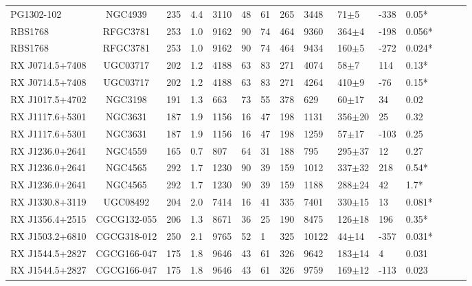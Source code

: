 \begin{landscape}
\begin{center}
\begin{longtable}{l c l l l l l l l l l l l l l}
PG1302-102  				&  NGC4939  					&  235  & 4.4 &  3110  	&  48  &  61  	&  265  &  3448  	&  71$\pm$5  		&  -338  	&  0.05*  \\
RBS1768  				&  RFGC3781  					&  253  & 1.0 &  9162  	&  90  &  74  	&  464  &  9360  	&  364$\pm$4  		&  -198  	&  0.056*  \\
RBS1768  				&  RFGC3781  					&  253  & 1.0 &  9162  	&  90  &  74  	&  464  &  9434  	&  160$\pm$5  		&  -272  	&  0.024*  \\
RX J0714.5+7408  			&  UGC03717  					&  202  & 1.2 &  4188  	&  63  &  83  	&  271  &  4074  	&  58$\pm$7  		&  114  	&  0.13*  \\
RX J0714.5+7408  			&  UGC03717  					&  202  & 1.2 &  4188  	&  63  &  83  	&  271  &  4264  	&  410$\pm$9  		&  -76  	&  0.15*  \\
RX J1017.5+4702  			&  NGC3198  					&  191  & 1.3 &  663  	&  73  &  55  	&  378  &  629  		&  60$\pm$17  		&  34  	&  0.02  \\
RX J1117.6+5301  			&  NGC3631 					&  187  & 1.9 &  1156  	&  16  &  47  	&  198  &  1131  	&  356$\pm$20  	&  25  	&  0.32  \\
RX J1117.6+5301  			&  NGC3631 	 				&  187  & 1.9 &  1156  	&  16  &  47  	&  198  &  1259  	&  57$\pm$17  		&  -103  	&  0.25  \\
RX J1236.0+2641  			&  NGC4559  					&  165  & 0.7 &  807  	&  64  &  31  	&  188  &  795  		&  295$\pm$37  	&  12  	&  0.27  \\
RX J1236.0+2641  			&  NGC4565  					&  292  & 1.7 &  1230  	&  90  &  39  	&  159  &  1012  	&  337$\pm$32  	&  218  	&  0.54*  \\
RX J1236.0+2641  			&  NGC4565  					&  292  & 1.7 &  1230  	&  90  &  39  	&  159  &  1188  	&  288$\pm$24  	&  42  	&  1.7*  \\
RX J1330.8+3119  			&  UGC08492  					&  204  & 2.0 &  7414  	&  16  &  41  	&  335  &  7401  	&  330$\pm$15  	&  13  	&  0.081*  \\
RX J1356.4+2515  			&  CGCG132-055  				&  206  & 1.3 &  8671  	&  36  &  25  	&  190  &  8475  	&  126$\pm$18  	&  196  	&  0.35*  \\
RX J1503.2+6810  			&  CGCG318-012  				&  250  & 2.1 &  9765  	&  52  &  1  	&  325  &  10122  	&  44$\pm$14  		&  -357  	&  0.031*  \\
RX J1544.5+2827  			&  CGCG166-047  				&  175  & 1.8 &  9646  	&  43  &  61  	&  326  &  9642  	&  183$\pm$14  	&  4  		&  0.031  \\
RX J1544.5+2827  			&  CGCG166-047  				&  175  & 1.8 &  9646  	&  43  &  61  	&  326  &  9759  	&  169$\pm$12  	&  -113  	&  0.023  \\

\end{longtable}
\end{center}
\end{landscape}
